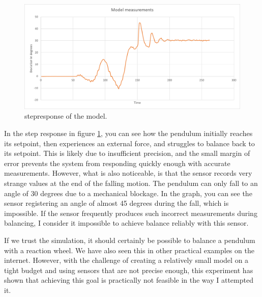 \documentclass{article}
\begin{document}
\begin{multicols}{2}
\begin{figure}[H]
\centering
\includegraphics[scale=0.37]{Model stepresponse}
\caption{stepresponse of the model.}
\label{fig:stepresponse of the model}
\end{figure}



In the step response in figure \ref{fig:stepresponse of the model}, you can see how the pendulum initially reaches its setpoint, then experiences an external force, and struggles to balance back to its setpoint. This is likely due to insufficient precision, and the small margin of error prevents the system from responding quickly enough with accurate measurements. However, what is also noticeable, is that the sensor records very strange values at the end of the falling motion. The pendulum can only fall to an angle of 30 degrees due to a mechanical blockage. In the graph, you can see the sensor registering an angle of almost 45 degrees during the fall, which is impossible. If the sensor frequently produces such incorrect measurements during balancing, I consider it impossible to achieve balance reliably with this sensor.

If we trust the simulation, it should certainly be possible to balance a pendulum with a reaction wheel. We have also seen this in other practical examples on the internet. However, with the challenge of creating a relatively small model on a tight budget and using sensors that are not precise enough, this experiment has shown that achieving this goal is practically not feasible in the way I attempted it.


\end{multicols}
\end{document}

